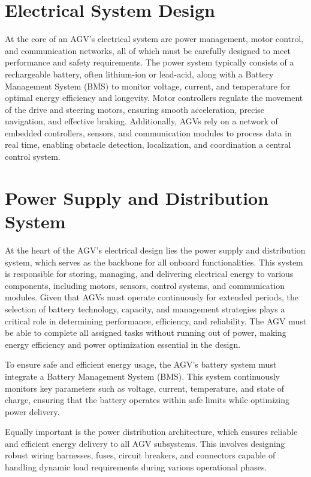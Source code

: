 \documentclass[../../main]{subfiles}
\begin{document}
\section{Electrical System Design}

At the core of an AGV’s electrical system are power management, motor control, 
and communication networks, all of which must be carefully designed to meet 
performance and safety requirements. The power system typically consists of 
a rechargeable battery, often lithium-ion or lead-acid, along with a Battery 
Management System (BMS) to monitor voltage, current, and temperature for 
optimal energy efficiency and longevity. Motor controllers regulate the 
movement of the drive and steering motors, ensuring smooth acceleration, 
precise navigation, and effective braking. Additionally, AGVs rely on a 
network of embedded controllers, sensors, and communication modules to 
process data in real time, enabling obstacle detection, localization, and 
coordination a central control system.

\section{Power Supply and Distribution System}

At the heart of the AGV's electrical design lies the 
power supply and distribution system, which serves as the backbone 
for all onboard functionalities. This system is responsible for 
storing, managing, and delivering electrical energy to various 
components, including motors, sensors, control systems, and 
communication modules. Given that AGVs must operate continuously 
for extended periods, the selection of battery technology, capacity, 
and management strategies plays a critical role in determining 
performance, efficiency, and reliability. The AGV must be able to 
complete all assigned tasks without running out of power, making 
energy efficiency and power optimization essential in the design. 

To ensure safe and efficient energy usage, the AGV's battery system 
must integrate a Battery Management System (BMS). 
This system continuously monitors key parameters such as voltage, 
current, temperature, and state of charge, ensuring that the battery 
operates within safe limits while optimizing power delivery. 

Equally important is the power distribution architecture, which 
ensures reliable and efficient energy delivery to all AGV subsystems. 
This involves designing robust wiring harnesses, fuses, circuit 
breakers, and connectors capable of handling dynamic load 
requirements during various operational phases.
\end{document}
